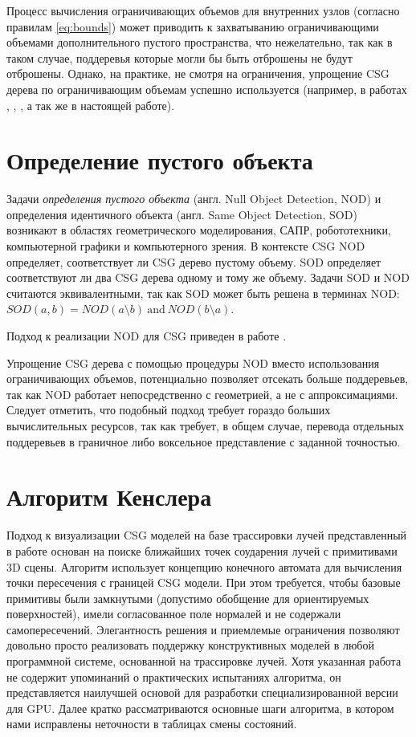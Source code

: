 Процесс вычисления ограничивающих объемов для внутренних узлов (согласно правилам \ref{eq:bounds}) может приводить к захватыванию ограничивающими объемами дополнительного пустого пространства, что нежелательно, так как в таком случае, поддеревья которые могли бы быть отброшены не будут отброшены. Однако, на практике, не смотря на ограничения, упрощение CSG дерева по ограничивающим объемам успешно используется (например, в работах \cite{bouatouch1987new}, \cite{goldfeather1989near}, \cite{wiegand1996interactive}, а так же в настоящей работе).

\section{Определение пустого объекта} \label{sect_csg_null_object}

Задачи \textit{определения пустого объекта} (англ. Null Object Detection, NOD) и определения идентичного объекта (англ. Same Object Detection, SOD) возникают в областях геометрического моделирования, САПР, робототехники, компьютерной графики и компьютерного зрения. В контексте CSG NOD определяет, соответствует ли CSG дерево пустому объему. SOD определяет соответствуют ли два CSG дерева одному и тому же объему. Задачи SOD и NOD считаются эквивалентными, так как SOD может быть решена в терминах NOD: $SOD(a, b) = NOD(a \setminus b) \ \text{and} \ NOD(b \setminus a)$.

Подход к реализации NOD для CSG приведен в работе \cite{tilove1984null}.

Упрощение CSG дерева с помощью процедуры NOD вместо использования ограничивающих объемов, потенциально позволяет отсекать больше поддеревьев, так как NOD работает непосредственно с геометрией, а не с аппроксимациями. Следует отметить, что подобный подход требует гораздо больших вычислительных ресурсов, так как требует, в общем случае, перевода отдельных поддеревьев в граничное либо воксельное представление с заданной точностью.

\section{Алгоритм Кенслера} \label{sect2_kensler}

Подход к визуализации CSG моделей на базе трассировки лучей представленный в работе \cite{kensler2006ray}основан на поиске ближайших точек соударения лучей с примитивами 3D сцены. Алгоритм использует концепцию конечного автомата для вычисления точки пересечения с границей CSG модели. При этом требуется, чтобы базовые примитивы были замкнутыми (допустимо обобщение для ориентируемых поверхностей), имели согласованное поле нормалей и не содержали самопересечений. Элегантность решения и приемлемые ограничения позволяют довольно просто реализовать поддержку конструктивных моделей в любой программной системе, основанной на трассировке лучей. Хотя указанная работа не содержит упоминаний о практических испытаниях алгоритма, он представляется наилучшей основой для разработки специализированной версии для GPU. Далее кратко рассматриваются основные шаги алгоритма, в котором нами исправлены неточности в таблицах смены состояний.

